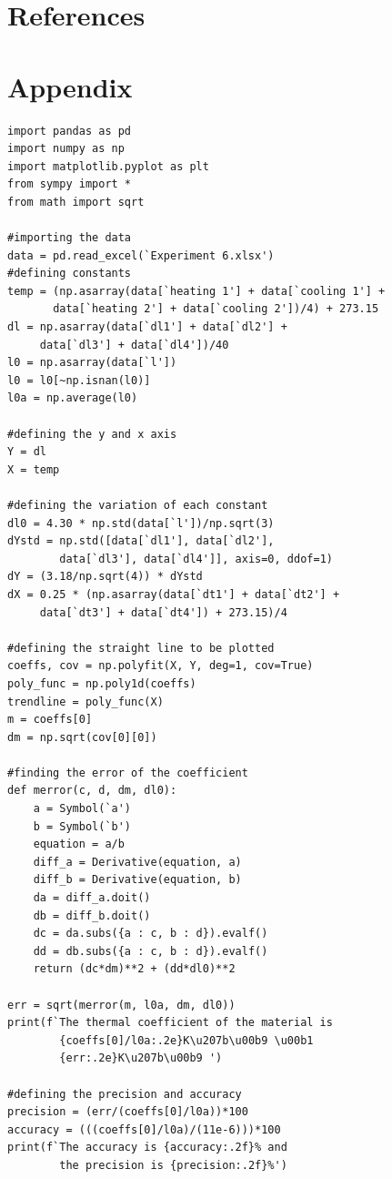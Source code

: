 \documentclass[12pt, a4paper]{article}
\begin{document}
\section*{References}
\printbibliography[heading=none]


\section*{Appendix}
\lstset{language=Python,
    showstringspaces=false,
    showtabs=false}
\begin{lstlisting}
import pandas as pd
import numpy as np
import matplotlib.pyplot as plt
from sympy import *
from math import sqrt

#importing the data
data = pd.read_excel(`Experiment 6.xlsx')
#defining constants
temp = (np.asarray(data[`heating 1'] + data[`cooling 1'] +
       data[`heating 2'] + data[`cooling 2'])/4) + 273.15
dl = np.asarray(data[`dl1'] + data[`dl2'] + 
     data[`dl3'] + data[`dl4'])/40
l0 = np.asarray(data[`l'])
l0 = l0[~np.isnan(l0)]
l0a = np.average(l0)

#defining the y and x axis
Y = dl
X = temp

#defining the variation of each constant
dl0 = 4.30 * np.std(data[`l'])/np.sqrt(3)
dYstd = np.std([data[`dl1'], data[`dl2'], 
        data[`dl3'], data[`dl4']], axis=0, ddof=1)
dY = (3.18/np.sqrt(4)) * dYstd
dX = 0.25 * (np.asarray(data[`dt1'] + data[`dt2'] + 
     data[`dt3'] + data[`dt4']) + 273.15)/4

#defining the straight line to be plotted
coeffs, cov = np.polyfit(X, Y, deg=1, cov=True)
poly_func = np.poly1d(coeffs)
trendline = poly_func(X)
m = coeffs[0]
dm = np.sqrt(cov[0][0])

#finding the error of the coefficient
def merror(c, d, dm, dl0):
    a = Symbol(`a')
    b = Symbol(`b')
    equation = a/b
    diff_a = Derivative(equation, a)
    diff_b = Derivative(equation, b)
    da = diff_a.doit()
    db = diff_b.doit()
    dc = da.subs({a : c, b : d}).evalf()
    dd = db.subs({a : c, b : d}).evalf()
    return (dc*dm)**2 + (dd*dl0)**2

err = sqrt(merror(m, l0a, dm, dl0))
print(f`The thermal coefficient of the material is 
        {coeffs[0]/l0a:.2e}K\u207b\u00b9 \u00b1 
        {err:.2e}K\u207b\u00b9 ')
        
#defining the precision and accuracy
precision = (err/(coeffs[0]/l0a))*100
accuracy = (((coeffs[0]/l0a)/(11e-6)))*100
print(f`The accuracy is {accuracy:.2f}% and 
        the precision is {precision:.2f}%')


\end{lstlisting}
\end{document}
